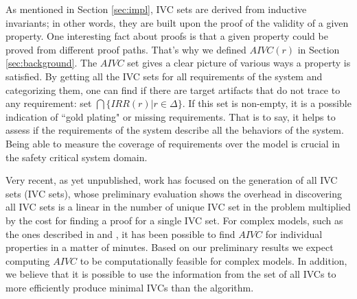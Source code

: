  As mentioned in Section \ref{sec:impl}, IVC sets are derived from inductive invariants; in other words, they are built upon the proof of the validity of a given property. One interesting fact about proofs
  is that a given property could be proved from different proof paths. That's why we defined $AIVC(r)$ in Section \ref{sec:background}. The $AIVC$ set gives a clear picture of various ways a property is satisfied. By getting all the IVC sets for all requirements of the system and categorizing them, one can find if there are target artifacts that do not trace to any requirement: set $\bigcap \{IRR (r) | r \in \Delta \}$.  If this set is non-empty, it is a possible indication of ``gold plating" or missing requirements. That is to say, it helps to assess if the requirements of the system describe all the behaviors of the system. Being able to measure the coverage of requirements over the model is crucial in the safety critical system domain.

Very recent, as yet unpublished, work has focused on the
generation of all IVC sets (IVC sets), whose preliminary evaluation
shows the overhead in discovering all IVC sets is a linear in the
number of unique IVC set in the problem multiplied by the cost
for finding a proof for a single IVC set. For complex models, such
as the ones described in \cite {QFCS15:backes} and \cite{hilt2013}, it has been possible to
find $AIVC$ for individual properties in a matter of minutes.
Based on our preliminary results we expect computing $AIVC$ to be computationally feasible for complex models. In
addition, we believe that it is possible to use the information
from the set of all IVCs to more efficiently produce minimal
IVCs than the \ucbfalg algorithm.
